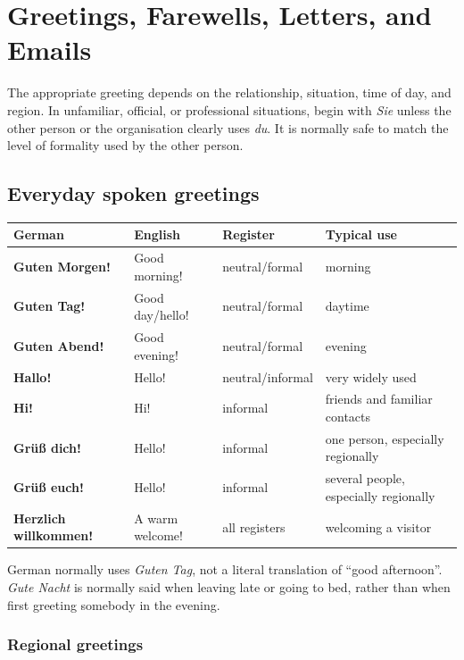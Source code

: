 \chapter{Greetings, Farewells, Letters, and Emails}

The appropriate greeting depends on the relationship, situation, time of day,
and region. In unfamiliar, official, or professional situations, begin with
\textit{Sie} unless the other person or the organisation clearly uses
\textit{du}. It is normally safe to match the level of formality used by the
other person.

\section{Everyday spoken greetings}

\begin{center}
\small
{}
\begin{tabularx}{\textwidth}{@{}>{\bfseries}l l l X@{}}
\toprule
German & English & Register & Typical use \\
\midrule
Guten Morgen! & Good morning! & neutral/formal & morning \\
Guten Tag! & Good day/hello! & neutral/formal & daytime \\
Guten Abend! & Good evening! & neutral/formal & evening \\
Hallo! & Hello! & neutral/informal & very widely used \\
Hi! & Hi! & informal & friends and familiar contacts \\
Grüß dich! & Hello! & informal & one person, especially regionally \\
Grüß euch! & Hello! & informal & several people, especially regionally \\
Herzlich willkommen! & A warm welcome! & all registers & welcoming a visitor \\
\bottomrule
\end{tabularx}
\end{center}

German normally uses \textit{Guten Tag}, not a literal translation of
\enquote{good afternoon}. \textit{Gute Nacht} is normally said when leaving late or
going to bed, rather than when first greeting somebody in the evening.

\subsection{Regional greetings}


